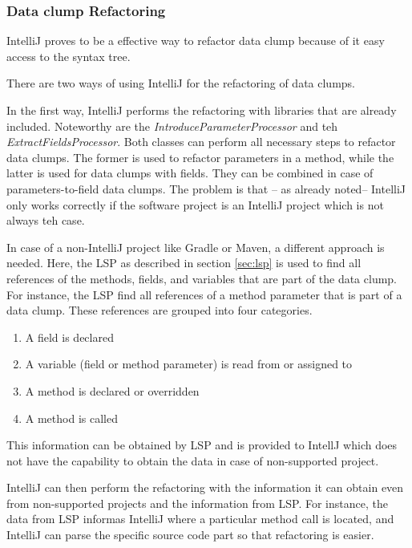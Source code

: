 \subsubsection{Data clump Refactoring}

IntelliJ proves to be a effective way to refactor data clump because of it easy access to the syntax tree.

There are two ways of using IntelliJ for the refactoring of data clumps.

In the first way, IntelliJ performs the refactoring with libraries that are already included. Noteworthy are the \textit{IntroduceParameterProcessor} and teh \textit{ExtractFieldsProcessor}. Both classes can perform all necessary steps to refactor data clumps. The former is used to refactor parameters in a method, while the latter is used for data clumps with fields. They can be combined in case of parameters-to-field data clumps. The problem is that -- as already noted-- IntelliJ only works correctly if the software project is an IntelliJ project which is not always teh case.

In case of a non-IntelliJ project like Gradle or Maven, a different approach is needed. Here, the \ac{LSP} as described in section \ref{sec:lsp} is used to find all references of the methods, fields, and variables that are part of the data clump. For instance, the \ac{LSP} find all references of a method parameter that is part of a data clump. These references are grouped into four categories. 
\begin{enumerate}
     \item A field is declared
    \item A variable (field or method parameter) is read from or assigned to
   
    \item A method is declared or overridden
    \item A method is called
\end{enumerate}

This information can be obtained by \ac{LSP} and is provided to IntellJ which does not have the capability to obtain the data in case of non-supported project.

IntelliJ can then perform the refactoring with the information it can obtain even from non-supported projects and the information from \ac{LSP}. For instance, the data from \ac{LSP} informas IntelliJ where a particular method call is located, and IntelliJ can parse the specific source code part so that refactoring is easier.

